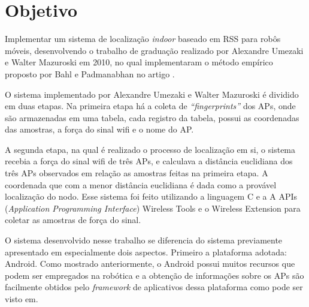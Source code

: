 \clearpage
\section{Objetivo}
	Implementar um sistema de localização \textit{indoor} baseado em RSS para robôs móveis,
	desenvolvendo o trabalho de graduação realizado por 
  Alexandre Umezaki e Walter Mazuroski em 2010, no qual implementaram o método empírico proposto
  por Bahl e Padmanabhan no artigo \cite{wifiRadar}.
  
  O sistema implementado por Alexandre Umezaki e Walter Mazuroski é dividido em duas etapas. 
  Na primeira etapa há a coleta de \textit{``fingerprints''} dos APs, onde são armazenadas em
  uma tabela, cada registro da tabela,  possui as coordenadas das amostras, 
  a força do sinal wifi e o nome do AP. 
  
  A segunda etapa, na qual é realizado o processo de localização 
  em si, o sistema recebia a força do sinal wifi de três APs, e calculava a distância euclidiana dos 
  três APs observados em relação as amostras feitas na primeira etapa. A coordenada 
  que com a menor distância euclidiana é dada como a provável localização do nodo. 
  Esse sistema foi feito utilizando a linguagem C
  e a A APIs (\textit{Application Programming Interface}) Wireless Tools e o Wireless Extension\cite{apic}
 para coletar as amostras de força do sinal.
  
  O sistema desenvolvido nesse trabalho se diferencia do sistema previamente apresentado em
  especialmente dois aspectos. Primeiro a plataforma adotada: Android. Como mostrado anteriormente,
  o Android possui muitos recursos que podem ser empregados na robótica e a obtenção de informações 
  sobre os APs são facilmente obtidos pelo \textit{framework} de aplicativos dessa plataforma como
  pode ser visto em\cite{getRss}.
   
